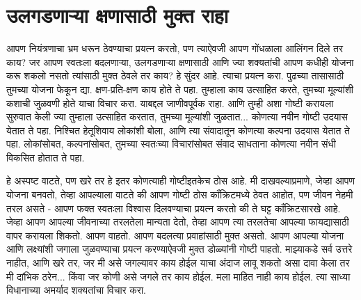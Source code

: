 \chapter{उलगडणाऱ्या क्षणासाठी मुक्त राहा}
आपण नियंत्रणाचा भ्रम धरून ठेवण्याचा प्रयत्न करतो, पण त्याऐवजी आपण गोंधळाला आलिंगन दिले तर काय? जर आपण स्वतःला बदलणाऱ्या, उलगडणाऱ्या क्षणासाठी आणि ज्या शक्यतांची आपण कधीही योजना करू शकलो नसतो त्यांसाठी मुक्त ठेवले तर काय?
हे सुंदर आहे.
त्याचा प्रयत्न करा. पुढच्या तासासाठी तुमच्या योजना फेकून द्या. क्षण-प्रति-क्षण काय होते ते पहा. तुम्हाला काय उत्साहित करते, तुमच्या मूल्यांशी कशाची जुळवणी होते याचा विचार करा. याबद्दल जाणीवपूर्वक राहा.
आणि तुम्ही अशा गोष्टी करायला सुरुवात केली ज्या तुम्हाला उत्साहित करतात, तुमच्या मूल्यांशी जुळतात... कोणत्या नवीन गोष्टी उदयास येतात ते पहा. निश्चित हेतूशिवाय लोकांशी बोला, आणि त्या संवादातून कोणत्या कल्पना उदयास येतात ते पहा. लोकांसोबत, कल्पनांसोबत, तुमच्या स्वतःच्या विचारांसोबत संवाद साधताना कोणत्या नवीन संधी विकसित होतात ते पहा.

हे अस्पष्ट वाटते, पण खरे तर हे इतर कोणत्याही गोष्टीइतकेच ठोस आहे. मी दाखवल्याप्रमाणे, जेव्हा आपण योजना बनवतो, तेव्हा आपल्याला वाटते की आपण गोष्टी ठोस कॉंक्रिटमध्ये ठेवत आहोत, पण जीवन नेहमी तरल असते - आपण फक्त स्वतःला विश्वास दिलवण्याचा प्रयत्न करतो की ते घट्ट कॉंक्रिटसारखे आहे.
जेव्हा आपण आपल्या जीवनाच्या तरलतेला मान्यता देतो, तेव्हा आपण त्या तरलतेचा आपल्या फायद्यासाठी वापर करायला शिकतो. आपण वाहतो. आपण बदलत्या प्रवाहांसाठी मुक्त असतो. आपण आपल्या योजना आणि लक्ष्यांशी जगाला जुळवण्याचा प्रयत्न करण्याऐवजी मुक्त डोळ्यांनी गोष्टी पाहतो.
माझ्याकडे सर्व उत्तरे नाहीत, आणि खरे तर, जर मी असे जगल्यावर काय होईल याचा अंदाज लावू शकतो असा दावा केला तर मी दांभिक ठरेन... किंवा जर कोणी असे जगले तर काय होईल.
मला माहित नाही काय होईल. त्या साध्या विधानाच्या अमर्याद शक्यतांचा विचार करा.

